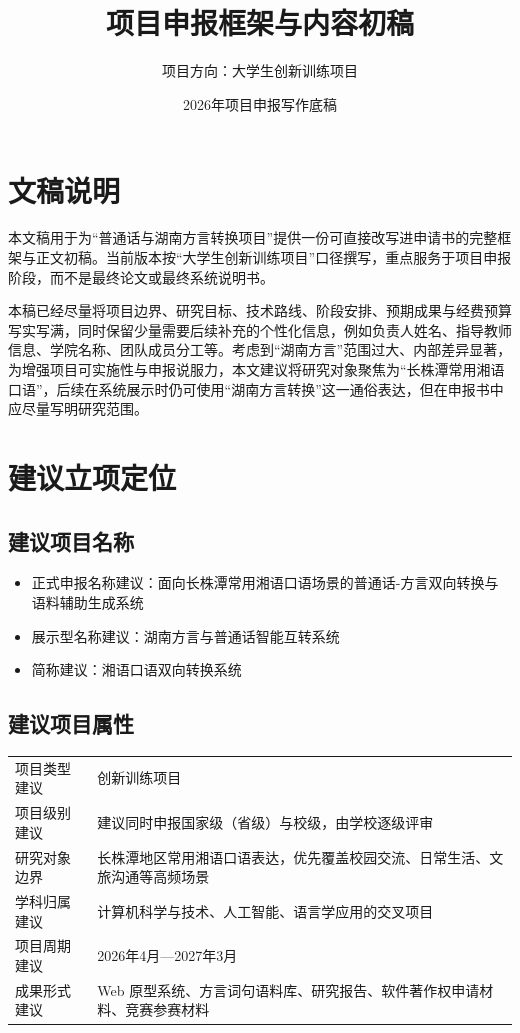 \documentclass[12pt,a4paper]{ctexart}
\title{\ProjectName\\项目申报框架与内容初稿}
\author{项目方向：大学生创新训练项目}
\date{2026年项目申报写作底稿}
\newcommand{\ProjectName}{面向长株潭常用湘语口语场景的普通话-方言双向转换与语料辅助生成系统}
\begin{document}
\maketitle
\tableofcontents
\newpage

\section{文稿说明}

本文稿用于为“普通话与湖南方言转换项目”提供一份可直接改写进申请书的完整框架与正文初稿。当前版本按“大学生创新训练项目”口径撰写，重点服务于项目申报阶段，而不是最终论文或最终系统说明书。

本稿已经尽量将项目边界、研究目标、技术路线、阶段安排、预期成果与经费预算写实写满，同时保留少量需要后续补充的个性化信息，例如负责人姓名、指导教师信息、学院名称、团队成员分工等。考虑到“湖南方言”范围过大、内部差异显著，为增强项目可实施性与申报说服力，本文建议将研究对象聚焦为“长株潭常用湘语口语”，后续在系统展示时仍可使用“湖南方言转换”这一通俗表达，但在申报书中应尽量写明研究范围。

\section{建议立项定位}

\subsection{建议项目名称}

\begin{itemize}
  \item 正式申报名称建议：\ProjectName
  \item 展示型名称建议：湖南方言与普通话智能互转系统
  \item 简称建议：湘语口语双向转换系统
\end{itemize}

\subsection{建议项目属性}

\begin{longtable}{p{4cm}p{10cm}}
\toprule
项目类型建议 & 创新训练项目 \\
项目级别建议 & 建议同时申报国家级（省级）与校级，由学校逐级评审 \\
研究对象边界 & 长株潭地区常用湘语口语表达，优先覆盖校园交流、日常生活、文旅沟通等高频场景 \\
学科归属建议 & 计算机科学与技术、人工智能、语言学应用的交叉项目 \\
项目周期建议 & 2026年4月—2027年3月 \\
成果形式建议 & Web 原型系统、方言词句语料库、研究报告、软件著作权申请材料、竞赛参赛材料 \\
\bottomrule
\end{longtable}
\end{document}
